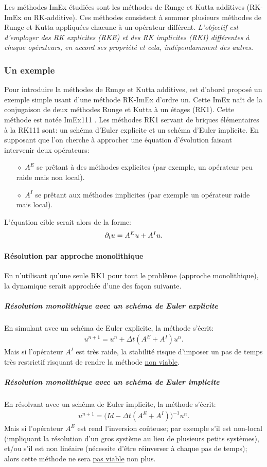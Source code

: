 \label{par:ImEx_presentation}
Les méthodes ImEx étudiées sont les méthodes de Runge et Kutta additives (RK-ImEx ou RK-additive).
Ces méthodes consistent à sommer plusieurs méthodes de Runge et Kutta appliquées chacune à un opérateur différent.
\textit{L'objectif est d'employer des RK explicites (RKE) et des RK implicites (RKI) différentes à chaque opérateurs, en accord
ses propriété et cela, indépendamment des autres.}
\subsubsection{Un exemple}
    Pour introduire la méthodes de Runge et Kutta additives, est d'abord proposé un exemple simple usant d'une méthode RK-ImEx
    d'ordre un. Cette ImEx naît de la conjugaison de deux méthodes Runge et Kutta à un étages (RK1). 
    Cette méthode est notée ImEx111 \cite{ASCHER1997151}.
    Les méthodes RK1 servant de briques élémentaires à la RK111 sont: un schéma d'Euler explicite et un schéma d'Euler implicite.
    En supposant que l'on cherche à approcher une équation d'évolution faisant intervenir deux opérateurs:
    \begin{itemize}
        \item[$\diamond$]$A^E$ se prêtant à des méthodes explicites (par exemple, un opérateur peu raide mais non local).
        \item[$\diamond$]$A^I$ se prêtant aux méthodes implicites (par exemple un opérateur raide mais local).
    \end{itemize}
    L'équation cible serait alors de la forme: 
    \begin{align}
        \partial_t u = A^E u + A^I u.
    \end{align}
    \paragraph{Résolution par approche monolithique}
        En n'utilisant qu'une seule RK1 pour tout le problème (approche monolithique), la dynamique serait approchée d'une des façon suivante.
        \subparagraph{Résolution monolithique avec un schéma de Euler explicite}
            En simulant avec un schéma de Euler explicite, la méthode s'écrit: 
            \begin{align}
                u^{n+1} = u^n + \Delta t (A^E + A^I) u^n.
            \end{align}
            Mais si l'opérateur $A^I$ est très raide, la stabilité risque d'imposer un pas de temps très restrictif risquant de rendre la méthode \underline{non viable}.
        \subparagraph{Résolution monolithique avec un schéma de Euler implicite}
            En résolvant avec un schéma de  Euler implicite, la méthode s'écrit:
            \begin{align}
                u^{n+1} = \bigl(Id - \Delta t (A^E + A^I)\bigr)^{-1} u^n.
            \end{align}
            Mais si l'opérateur $A^E$ est rend l'inversion coûteuse;
            par exemple s'il est non-local (impliquant la résolution d'un gros système au lieu de plusieurs petits systèmes), 
            et/ou s'il est non linéaire (nécessite d'être réinverser à chaque pas de temps);
            alors cette méthode ne sera \underline{pas viable} non plus.
